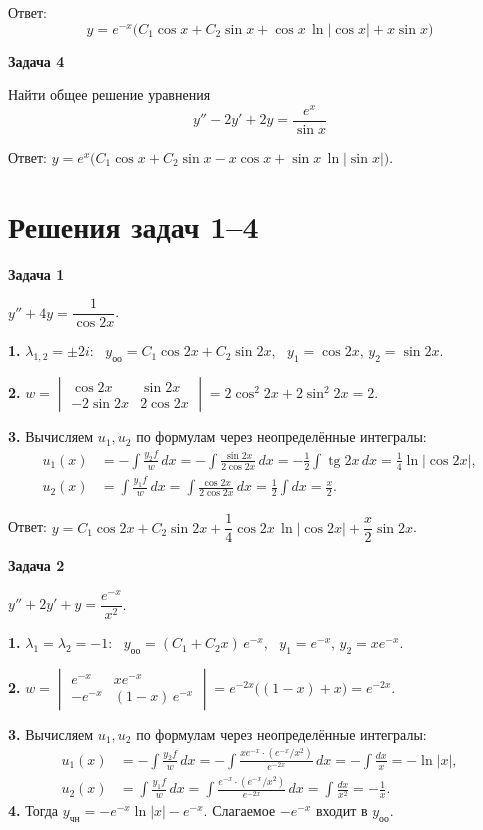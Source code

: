 \documentclass[11pt,a4paper]{article}
\newcommand{\example}[1]{\par\medskip\noindent\textbf{#1}\par\nopagebreak\smallskip}
\newcommand{\yoo}{y_{\text{оо}}}
\newcommand{\ych}{y_{\text{чн}}}
\newcommand{\tgn}{\operatorname{tg}}
\begin{document}
Ответ:
\[
  y = e^{-x}\bigl(C_1\cos x + C_2\sin x + \cos x\,\ln|\cos x| + x\sin x\bigr)
\]

\example{Задача 4}

Найти общее решение уравнения
\[
  y'' - 2y' + 2y = \frac{e^{x}}{\sin x}
\]

Ответ: $y = e^{x}\bigl(C_1\cos x + C_2\sin x - x\cos x + \sin x\,\ln|\sin x|\bigr)$.


\newpage
\section*{Решения задач 1--4}

\example{Задача 1}

$y'' + 4y = \dfrac{1}{\cos 2x}$.

\textbf{1.} $\lambda_{1,2} = \pm 2i$: \ $\yoo = C_1\cos 2x + C_2\sin 2x$, \ $y_1 = \cos 2x$, $y_2 = \sin 2x$.

\textbf{2.} $w = \begin{vmatrix} \cos 2x & \sin 2x \\ -2\sin 2x & 2\cos 2x \end{vmatrix} = 2\cos^2 2x + 2\sin^2 2x = 2$.

\textbf{3.} Вычисляем $u_1,u_2$ по формулам через неопределённые интегралы:
\[
  \begin{aligned}
    u_1(x) &= -\int\frac{y_2f}{w}\,dx
      = -\int\frac{\sin 2x}{2\cos 2x}\,dx
      = -\frac12\int\tgn 2x\,dx = \frac14\ln|\cos 2x|,\\
    u_2(x) &= \int\frac{y_1f}{w}\,dx
      = \int\frac{\cos 2x}{2\cos 2x}\,dx
      = \frac12\int dx = \frac{x}{2}.
  \end{aligned}
\]

Ответ: $y = C_1\cos 2x + C_2\sin 2x + \dfrac14\cos 2x\,\ln|\cos 2x| + \dfrac{x}{2}\sin 2x$.

\example{Задача 2}

$y'' + 2y' + y = \dfrac{e^{-x}}{x^2}$.

\textbf{1.} $\lambda_1 = \lambda_2 = -1$: \ $\yoo = (C_1 + C_2 x)\, e^{-x}$, \ $y_1 = e^{-x}$, $y_2 = x e^{-x}$.

\textbf{2.} $w = \begin{vmatrix} e^{-x} & x e^{-x} \\ -e^{-x} & (1 - x)\, e^{-x} \end{vmatrix} = e^{-2x}\bigl((1 - x) + x\bigr) = e^{-2x}$.

\textbf{3.} Вычисляем $u_1,u_2$ по формулам через неопределённые интегралы:
\[
  \begin{aligned}
    u_1(x) &= -\int\frac{y_2f}{w}\,dx
      = -\int\frac{xe^{-x}\cdot(e^{-x}/x^2)}{e^{-2x}}\,dx
      = -\int\frac{dx}{x} = -\ln|x|,\\
    u_2(x) &= \int\frac{y_1f}{w}\,dx
      = \int\frac{e^{-x}\cdot(e^{-x}/x^2)}{e^{-2x}}\,dx
      = \int\frac{dx}{x^2} = -\frac1x.
  \end{aligned}
\]
\textbf{4.} Тогда $\ych = -e^{-x}\ln|x| - e^{-x}$. Слагаемое $-e^{-x}$ входит в $\yoo$.
\end{document}
